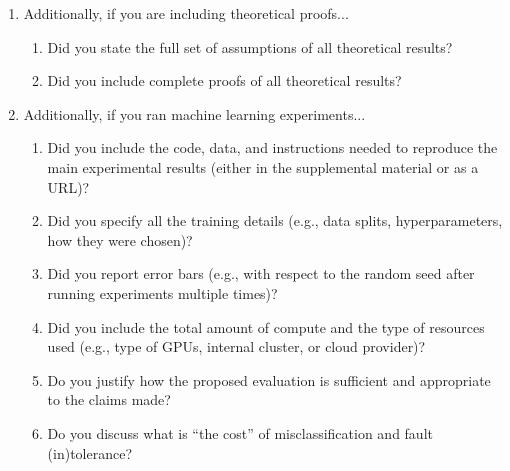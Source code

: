\begin{enumerate}
\begin{enumerate}
\item Have you provided justifications for all theoretical results? \ChecklistTBD
\item Did you discuss competing hypotheses or theories that might challenge or complement your theoretical results? \ChecklistTBD
\item Have you considered alternative mechanisms or explanations that might account for the same outcomes observed in your study? \ChecklistTBD
\item Did you address potential biases or limitations in your theoretical framework? \ChecklistTBD
\item Have you related your theoretical results to the existing literature in social science? \ChecklistTBD
\item Did you discuss the implications of your theoretical results for policy, practice, or further research in the social science domain? \ChecklistTBD
\end{enumerate}
\item Additionally, if you are including theoretical proofs...
\begin{enumerate}
\item Did you state the full set of assumptions of all theoretical results? \ChecklistTBD
\item Did you include complete proofs of all theoretical results? \ChecklistTBD
\end{enumerate}
\item Additionally, if you ran machine learning experiments...
\begin{enumerate}
\item Did you include the code, data, and instructions needed to reproduce the main experimental results (either in the supplemental material or as a URL)? \ChecklistTBD
\item Did you specify all the training details (e.g., data splits, hyperparameters, how they were chosen)? \ChecklistTBD
\item Did you report error bars (e.g., with respect to the random seed after running experiments multiple times)? \ChecklistTBD
\item Did you include the total amount of compute and the type of resources used (e.g., type of GPUs, internal cluster, or cloud provider)? \ChecklistTBD
\item Do you justify how the proposed evaluation is sufficient and appropriate to the claims made? \ChecklistTBD
\item Do you discuss what is ``the cost'' of misclassification and fault (in)tolerance? \ChecklistTBD

\end{enumerate}
\end{enumerate}
